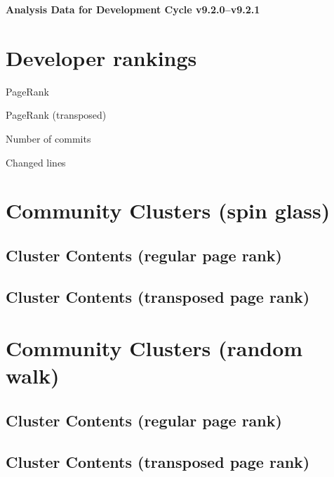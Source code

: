 \documentclass{article}
\begin{document}
\setlength{\parindent}{0pt}
\begin{center}
\begin{Large}
\textbf{Analysis Data for Development Cycle v9.2.0--v9.2.1}
\end{Large}
\end{center}
\section{Developer rankings}
\begin{small}\renewcommand{\tabcolsep}{1pt}
\begin{minipage}{0.5\linewidth}
PageRank\\

\end{minipage}%
\begin{minipage}{0.5\linewidth}
PageRank (transposed)\\

\end{minipage}

\renewcommand{\tabcolsep}{5pt}
\begin{minipage}{0.5\linewidth}
Number of commits\\

\end{minipage}%
\begin{minipage}{0.5\linewidth}
Changed lines\\

\end{minipage}
\end{small}
\newpage\section{Community Clusters (spin glass)}
\subsection{Cluster Contents (regular page rank)}
\newpage\subsection{Cluster Contents (transposed page rank)}
\newpage\section{Community Clusters (random walk)}
\subsection{Cluster Contents (regular page rank)}
\newpage\subsection{Cluster Contents (transposed page rank)}
\end{document}
